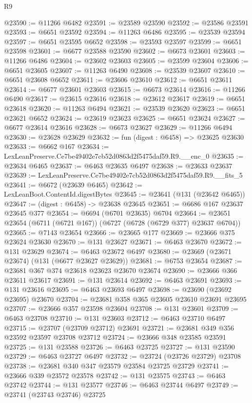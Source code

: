 \begin{lexlean}{R9}
\begin{coremodule}
@23590 := @11266 @6482
@23591 := @23589 @23590
@23592 := @23586 @23591
@23593 := @6651 @23592
@23594 := @11263 @6486
@23595 := @23539 @23594
@23597 := @6651 @23595 @6652
@23598 := @23593 @23597
@23599 := @6651 @23598
@23601 := @6677 @23588 @23590
@23602 := @6673 @23601
@23603 := @11266 @6486
@23604 := @23602 @23603
@23605 := @23599 @23604
@23606 := @6651 @23605
@23607 := @11263 @6490
@23608 := @23539 @23607
@23610 := @6651 @23608 @6652
@23611 := @23606 @23610
@23612 := @6651 @23611
@23614 := @6677 @23601 @23603
@23615 := @6673 @23614
@23616 := @11266 @6490
@23617 := @23615 @23616
@23618 := @23612 @23617
@23619 := @6651 @23618
@23620 := @11263 @6494
@23621 := @23539 @23620
@23623 := @6651 @23621 @6652
@23624 := @23619 @23623
@23625 := @6651 @23624
@23627 := @6677 @23614 @23616
@23628 := @6673 @23627
@23629 := @11266 @6494
@23630 := @23628 @23629
@23632 := fun (digest : @6458) => @23625 @23630
@23633 := @6662 @167
@23634 := LexLeanPreserve.Ce7be49402e7cb52d0863d2f5475daf59.R9.__enc_0
@23635 := @23634 @6465
@23637 := @6463 @23635 @6497
@23638 := @23633 @23637
@23639 := LexLeanPreserve.Ce7be49402e7cb52d0863d2f5475daf59.R9.__fits_5
@23641 := @6672 (@23639 @6465)
@23642 := LexLeanBoot.ContentId.digestBytes
@23645 := @23641 (@131 (@23642 @6465))
@23647 := (digest : @6458) -> @23638 @23645
@23651 := @6686 @167 @23637 @23645 @377
@23654 := @6694 (@6701 @23635) @6704
@23664 := @23651 @23654 (@6711 (@6721 @167)) (@6727 (@6728 (@6729 @377) @23637 @6704))
@23665 := @7143 @23654
@23666 := @23665 @177
@23669 := @23666 @375 @23624 @23630
@23670 := @131 @23627
@23671 := @6463 @23670
@23672 := @131 @23629
@23674 := @6463 @23672 @6497
@23680 := @23669 (@23671 @23674) (@131 (@6677 @23627 @23629))
@23681 := @6753 @23654
@23687 := @23681 @367 @374 @23618 @23623 @23670 @23674
@23690 := @23666 @366 @23611 @23617
@23691 := @131 @23614
@23692 := @6463 @23691
@23693 := @131 @23616
@23695 := @6463 @23693 @6497
@23698 := @23690 (@23692 @23695) @23670
@23704 := @23681 @358 @365 @23605 @23610 @23691 @23695
@23707 := @23666 @357 @23598 @23604
@23708 := @131 @23601
@23709 := @6463 @23708
@23710 := @131 @23603
@23712 := @6463 @23710 @6497
@23715 := @23707 (@23709 @23712) @23691
@23721 := @23681 @349 @356 @23592 @23597 @23708 @23712
@23724 := @23666 @348 @23585 @23591
@23725 := @131 @23588
@23726 := @6463 @23725
@23727 := @131 @23590
@23729 := @6463 @23727 @6497
@23732 := @23724 (@23726 @23729) @23708
@23738 := @23681 @340 @347 @23579 @23584 @23725 @23729
@23741 := @23666 @339 @23572 @23578
@23742 := @131 @23575
@23743 := @6463 @23742
@23744 := @131 @23577
@23746 := @6463 @23744 @6497
@23749 := @23741 (@23743 @23746) @23725

\end{coremodule}
\end{lexlean}
